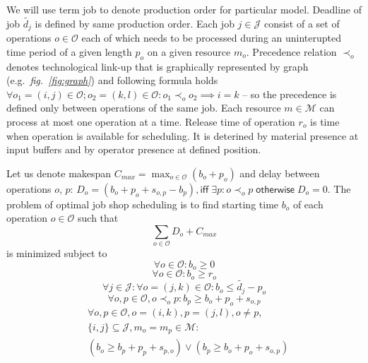 \documentclass[a4paper,journal,twocolumn]{IEEEtran}
\begin{document}
We will use term job to denote production order for particular model. Deadline of job $\tilde{d_j}$ is defined by same production order.
Each job $j\in\mathcal{J}$ consist of a set of operations $o\in\mathcal{O}$ each of which needs 
to be processed during an uninterupted time period of a given length $p_o$ on a given resource $m_o$.
Precedence relation $\prec_o$ denotes technological link-up that is graphically represented by graph 
(e.g.~\emph{fig.~\ref{fig:graph}}) and following formula holds 
$\forall o_1=(i,j)\in\mathcal{O};o_2=(k,l)\in\mathcal{O}: o_1\prec_oo_2 \implies i=k $ -- so the precedence is defined only between
operations of the same job.
Each resource $m\in\mathcal{M}$ can process at most one operation at a time.
Release time of operation $r_o$ is time when operation is available for scheduling. It is deterined by
material presence at input buffers and by operator presence at defined position.

Let us denote makespan $C_{max} = \max_{o\in\mathcal{O}}\left(b_o + p_o\right)$ and 
delay between operations $o$, $p$:  $D_o = \left(b_o + p_o +s_{o,p}-b_p\right), \mathsf{iff}\; \exists p: o \prec_o p\; \mathsf{otherwise}\;D_o= 0$.
The problem of optimal job shop scheduling is to find starting time $b_o$ of each operation $o\in\mathcal{O}$ such that
\begin{equation}\label{eq:subject}
	 \sum_{o\in\mathcal{O}}D_o + C_{max}
\end{equation}
is minimized subject to
\begin{equation} \label{eq:lowboundzero}
	\forall o\in\mathcal{O}: b_o \ge 0 
\end{equation}
\begin{equation}\label{eq:lowbound}
	\forall o\in\mathcal{O}: b_o \ge r_o
\end{equation}
\begin{equation}\label{eq:upperbound}
	\forall j \in \mathcal{J}: \forall o=(j,k)\in\mathcal{O}: b_o\le \tilde{d_j}-p_o
\end{equation}
\begin{equation}\label{eq:precconstraints}
	\forall o,p \in\mathcal{O}, o\prec_o p:b_p \ge b_o+p_o+s_{o,p}
\end{equation}
\begin{align}\label{eq:capconstraints}
	& \forall o,p\in\mathcal{O},o=(i,k),p=(j,l),o\neq p, \\
	& \{i,j\}\subseteq\mathcal{J}, m_o=m_p\in \mathcal{M}: \nonumber \\
	& (b_o \ge b_p+p_p+s_{p,o}) \vee  (b_p \ge b_o+p_o+s_{o,p})  \nonumber 
\end{align}
\end{document}
